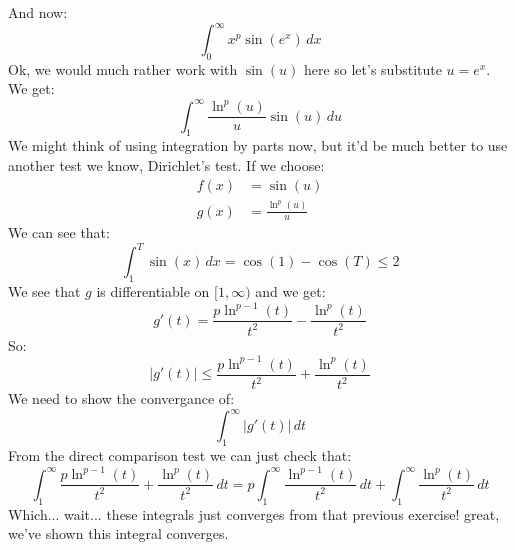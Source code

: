 \documentclass[11pt,a4paper]{article}
\begin{document}
	\newpage
	
	And now:
	\[
		\int_{0}^{\infty}{x^p\sin(e^x)\,dx}
	\]
	Ok, we would much rather work with $\sin(u)$ here so let's substitute
	$u = e^x$. We get:
	\[
		\int_{1}^{\infty}{\frac{\ln^p(u)}{u}\sin(u)\,du}
	\]
	We might think of using integration by parts now, but it'd be much better
	to use another test we know, Dirichlet's test. If we choose:
	\begin{align*}
		f(x) &= \sin(u) \\
		g(x) &= \frac{\ln^p(u)}{u}
	\end{align*}
	We can see that:
	\[
		\int_{1}^{T}{\sin(x)\,dx} = \cos(1) - \cos(T) \le 2
	\]
	We see that $g$ is differentiable on $[1,\infty)$ and we get:
	\[
		g'(t) = 
		\dfrac{p\ln^{p-1}\left(t\right)}{t^2}-\dfrac{\ln^p\left(t\right)}{t^2}
	\]
	So:
	\[
		|g'(t)| \le 
		\dfrac{p\ln^{p-1}\left(t\right)}{t^2}+\dfrac{\ln^p\left(t\right)}{t^2}
	\]
	We need to show the convergance of:
	\[
		\int_{1}^{\infty}{|g'(t)|\,dt}
	\]
	From the direct comparison test we can just check that:
	\[
		\int_{1}^{\infty}
		{\dfrac{p\ln^{p-1}\left(t\right)}{t^2}+
		\dfrac{\ln^p\left(t\right)}{t^2}\,dt} = 
		p\int_{1}^{\infty}{\dfrac{\ln^{p-1}\left(t\right)}{t^2}\,dt} + 
		\int_{1}^{\infty}{\dfrac{\ln^p\left(t\right)}{t^2}\,dt}
	\]
	Which... wait... these integrals just converges from that previous 
	exercise! great, we've shown this integral converges.
	
	\newpage
	
\end{document}
